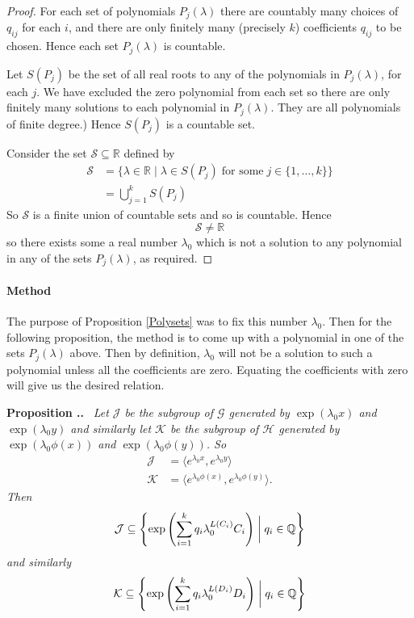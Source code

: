 \documentclass[honours]{UNSWthesis}
\newcommand{\R}{\mathbb{R}}
\newcommand{\Q}{\mathbb{Q}}
\newcommand{\G}{\mathcal{G}}
\newcommand{\1}{\mathbf{e}_{1}}
\newcommand{\2}{\mathbf{e}_{3}}
\newcommand{\3}{\mathbf{e}_{3}}
\newcounter{Item}[section]
\newenvironment{Proposition}{\medskip
                            \refstepcounter{Item}
                            \noindent
                           {\bf Proposition \thesection.\theItem.}\ %
                            \begingroup \sl}
                           {\endgroup\medskip}
\begin{document}
\begin{proof}
For each set of polynomials $P_j(\lambda)$ there are countably many choices of $q_{ij}$ for each $i$, and there are only finitely many (precisely $k$) coefficients $q_{ij}$ to be chosen. Hence each set $P_j(\lambda)$ is countable. 

Let $S(P_j)$ be the set of all real roots to any of the polynomials in $P_j (\lambda)$, for each $j$. We have excluded the zero polynomial from each set so there are only finitely many solutions to each polynomial in $P_j (\lambda)$. They are all polynomials of finite degree.) Hence $S(P_j)$ is a countable set. 

Consider the set $\mathcal{S} \subseteq \R$ defined by
\begin{align*}
\mathcal{S} &= \{ \lambda \in \R \mid \lambda \in S(P_j) \; \text{for some} \; j \in \{1,\ldots,k\}\} \\
&= \bigcup_{j=1}^{k} S(P_j) 
\end{align*}
So $\mathcal{S}$ is a finite union of countable sets and so is countable. Hence
\[
\mathcal{S} \neq \R
\]
so there exists some a real number $\lambda_0$ which is not a solution to any polynomial in any of the sets $P_j(\lambda)$, as required.
\end{proof}

\paragraph*{Method}
The purpose of Proposition \ref{Polysets} was to fix this number $\lambda_0$. Then for the following proposition, the method is to come up with a polynomial in one of the sets $P_j(\lambda)$ above. Then by definition, $\lambda_0$ will not be a solution to such a polynomial unless all the coefficients are zero. Equating the coefficients with zero will give us the desired relation.

\begin{Proposition}
Let $\mathcal{J}$ be the subgroup of $\G$ generated by $\exp(\lambda_0 x)$ and $\exp(\lambda_0 y)$ and similarly let $\mathcal{K}$ be the subgroup of $\mathcal{H}$ generated by $\exp(\lambda_0 \phi(x))$ and $\exp(\lambda_0 \phi(y))$. So 
\begin{align*}
\mathcal{J} &=\langle e^{\lambda_0 x}, e^{\lambda_0 y} \rangle \\
\mathcal{K} &= \langle e^{\lambda_0\phi(x)}, e^{\lambda_0 \phi(y)} \rangle.
\end{align*}
Then 
\[
\mathcal{J} \subseteq \left\lbrace \exp \left( \sum\limits_{i=1}^{k} q_{i}\lambda_{0}^{L(C_{i})}C_{i} \right) \biggm| q_{i} \in \Q \right\rbrace
\]
and similarly
\[
\mathcal{K} \subseteq \left\lbrace \exp \left( \sum\limits_{i=1}^{k} q_{i}\lambda_{0}^{L(D_{i})}D_{i} \right) \biggm| q_{i} \in \Q \right\rbrace
\]
\end{Proposition}
\end{document}
